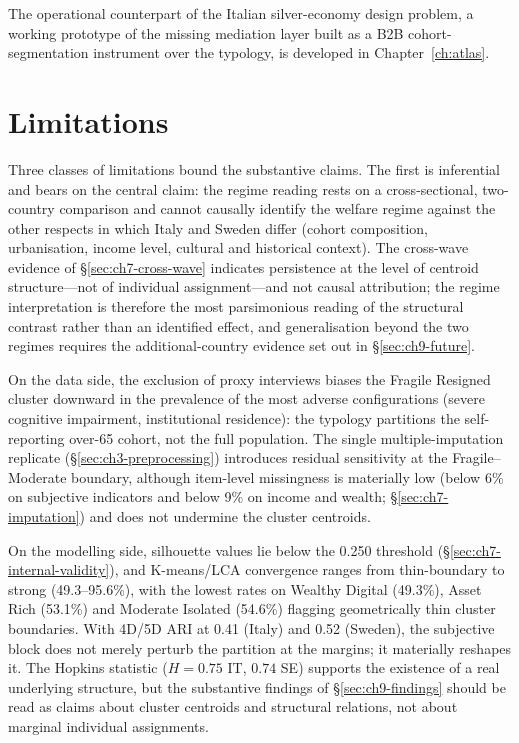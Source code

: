 The operational counterpart of the Italian silver-economy design problem, a working prototype of the missing mediation layer built as a B2B cohort-segmentation instrument over the typology, is developed in Chapter~\ref{ch:atlas}.

\section{Limitations}
\label{sec:ch9-limitations}

Three classes of limitations bound the substantive claims. The first is inferential and bears on the central claim: the regime reading rests on a cross-sectional, two-country comparison and cannot causally identify the welfare regime against the other respects in which Italy and Sweden differ (cohort composition, urbanisation, income level, cultural and historical context). The cross-wave evidence of \S\ref{sec:ch7-cross-wave} indicates persistence at the level of centroid structure---not of individual assignment---and not causal attribution; the regime interpretation is therefore the most parsimonious reading of the structural contrast rather than an identified effect, and generalisation beyond the two regimes requires the additional-country evidence set out in \S\ref{sec:ch9-future}.

On the data side, the exclusion of proxy interviews biases the Fragile Resigned cluster downward in the prevalence of the most adverse configurations (severe cognitive impairment, institutional residence): the typology partitions the self-reporting over-65 cohort, not the full population. The single multiple-imputation replicate (\S\ref{sec:ch3-preprocessing}) introduces residual sensitivity at the Fragile--Moderate boundary, although item-level missingness is materially low (below 6\% on subjective indicators and below 9\% on income and wealth; \S\ref{sec:ch7-imputation}) and does not undermine the cluster centroids.

On the modelling side, silhouette values lie below the 0.250 threshold (\S\ref{sec:ch7-internal-validity}), and K-means/LCA convergence ranges from thin-boundary to strong (49.3--95.6\%), with the lowest rates on Wealthy Digital (49.3\%), Asset Rich (53.1\%) and Moderate Isolated (54.6\%) flagging geometrically thin cluster boundaries. With 4D/5D ARI at 0.41 (Italy) and 0.52 (Sweden), the subjective block does not merely perturb the partition at the margins; it materially reshapes it. The Hopkins statistic ($H = 0.75$ IT, $0.74$ SE) supports the existence of a real underlying structure, but the substantive findings of \S\ref{sec:ch9-findings} should be read as claims about cluster centroids and structural relations, not about marginal individual assignments.

